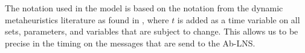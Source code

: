 \documentclass[preprint,12pt,authoryear]{elsarticle}
\begin{document}
The notation used in the model is based on the notation from the dynamic metaheuristics literature as found in \cite{yangMetaheuristicsDynamicCombinatorial2013}, where $t$ is added as a time variable on all sets, parameters, and variables that are subject to change.
This allows us to be precise in the timing on the messages that are send to the Ab-LNS.  

\end{document}
